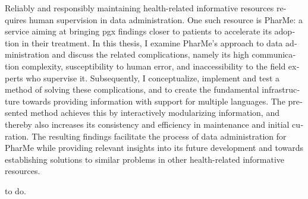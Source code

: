 \null\vfil
\begin{otherlanguage}{english}
\begin{center}\textsf{\textbf{\abstractname}}\end{center}

    \noindent Reliably and responsibly maintaining health-related informative
    resources requires human supervision in data administration. One such
    resource is PharMe: a service aiming at bringing \gls{pgx} findings closer
    to patients to accelerate its adoption in their treatment. In this thesis,
    I examine PharMe's approach to data administration and discuss the related
    complications, namely its high communication complexity, susceptibility to
    human error, and inaccessibility to the field experts who supervise it.
    Subsequently, I conceptualize, implement and test a method of solving these
    complications, and to create the fundamental infrastructure towards
    providing information with support for multiple languages. The presented
    method achieves this by interactively modularizing information, and thereby
    also increases its consistency and efficiency in maintenance and initial
    curation. The resulting findings facilitate the process of data
    administration for PharMe while providing relevant insights into its future
    development and towards establishing solutions to similar problems in other
    health-related informative resources.




\end{otherlanguage}
\vfil\null

\null\vfil
\begin{otherlanguage}{ngerman}
\begin{center}\textsf{\textbf{\abstractname}}\end{center}

    \noindent to do.

\end{otherlanguage}
\vfil\null
